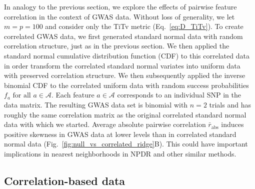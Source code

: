 \documentclass[aoas]{imsart}
\begin{document}
In analogy to the previous section, we explore the effects of pairwise feature correlation in the context of GWAS data. Without loss of generality, we let $m=p=100$ and consider only the TiTv metric (Eq.~\ref{eq:D_TiTv}). To create correlated GWAS data, we first generated standard normal data with random correlation structure, just as in the previous section. We then applied the standard normal cumulative distribution function (CDF) to this correlated data in order transform the correlated standard normal variates into uniform data with preserved correlation structure. We then subsequently applied the inverse binomial CDF to the correlated uniform data with random success probabilities $f_a \text{ for all } a \in \mathcal{A}$. Each feature $a \in \mathcal{A}$ corresponds to an individual SNP in the data matrix. The resulting GWAS data set is binomial with $n=2$ trials and has roughly the same correlation matrix as the original correlated standard normal data with which we started. Average absolute pairwise correlation $\bar{r}_\text{abs}$ induces positive skewness in GWAS data at lower levels than in correlated standard normal data (Fig.~\ref{fig:null_vs_correlated_ridge}B). This could have important implications in nearest neighborhoods in NPDR and other similar methods.
%

\subsection{Correlation-based data}
\end{document}
